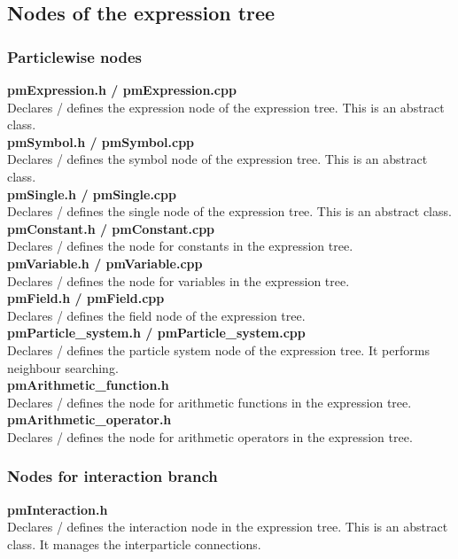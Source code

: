 \documentclass[a4paper,12pt,openany]{book}
\theoremstyle{break}
\begin{document}
\subsection{Nodes of the expression tree}
\subsubsection{Particlewise nodes}
\textbf{pmExpression.h / pmExpression.cpp} \\
Declares / defines the expression node of the expression tree. This is an abstract class. \\

\textbf{pmSymbol.h / pmSymbol.cpp} \\
Declares / defines the symbol node of the expression tree. This is an abstract class. \\

\textbf{pmSingle.h / pmSingle.cpp} \\
Declares / defines the single node of the expression tree. This is an abstract class. \\

\textbf{pmConstant.h / pmConstant.cpp} \\
Declares / defines the node for constants in the expression tree. \\

\textbf{pmVariable.h / pmVariable.cpp} \\
Declares / defines the node for variables in the expression tree. \\

\textbf{pmField.h / pmField.cpp} \\
Declares / defines the field node of the expression tree. \\

\textbf{pmParticle\_system.h / pmParticle\_system.cpp} \\
Declares / defines the particle system node of the expression tree. It performs neighbour searching. \\

\textbf{pmArithmetic\_function.h} \\
Declares / defines the node for arithmetic functions in the expression tree. \\

\textbf{pmArithmetic\_operator.h} \\
Declares / defines the node for arithmetic operators in the expression tree. \\


\subsubsection{Nodes for interaction branch}
\textbf{pmInteraction.h} \\
Declares / defines the interaction node in the expression tree. This is an abstract class. It manages the interparticle connections. \\
\end{document}
